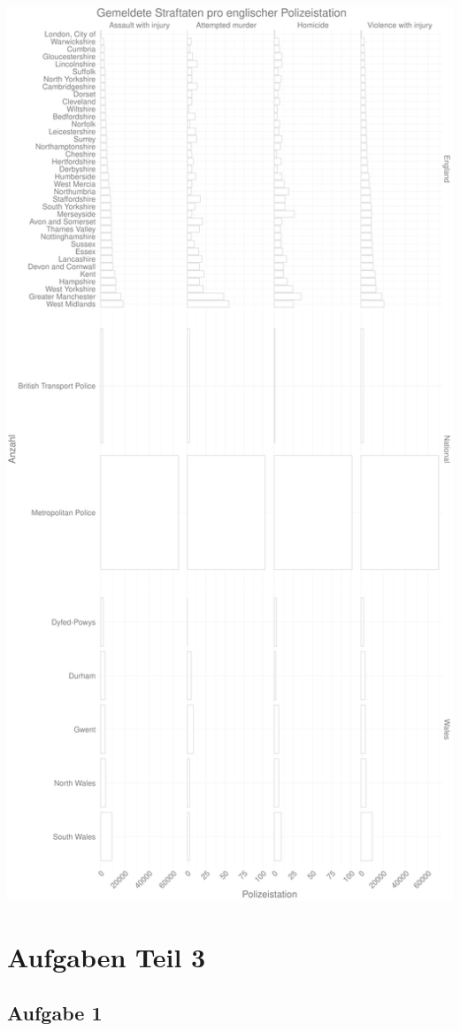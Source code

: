 \documentclass[
]{book}
\begin{document}
\begin{center}\includegraphics[width=.8\textwidth]{imgs/police_stations} \end{center}

\hypertarget{aufgaben-teil-3}{%
\section{Aufgaben Teil 3}\label{aufgaben-teil-3}}

\hypertarget{aufgabe-1-5}{%
\subsection{Aufgabe 1}\label{aufgabe-1-5}}
\end{document}
